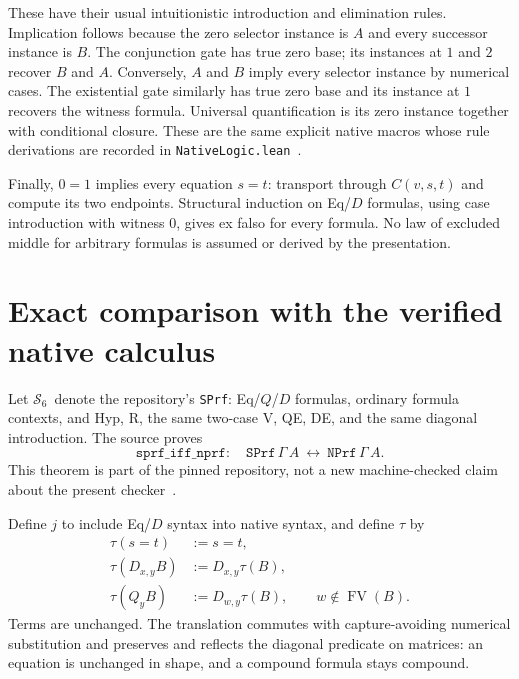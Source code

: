 \documentclass[11pt]{article}
\theoremstyle{definition}\newtheorem{definition}[theorem]{Definition}
\theoremstyle{remark}\newtheorem{remark}[theorem]{Remark}
\newcommand{\Ssix}{\ensuremath{\mathcal S_6}}
\newcommand{\FV}{\operatorname{FV}}
\begin{document}
These have their usual intuitionistic introduction and elimination rules. Implication follows because the zero selector instance is $A$ and every successor instance is $B$. The conjunction gate has true zero base; its instances at $1$ and $2$ recover $B$ and $A$. Conversely, $A$ and $B$ imply every selector instance by numerical cases. The existential gate similarly has true zero base and its instance at $1$ recovers the witness formula. Universal quantification is its zero instance together with conditional closure. These are the same explicit native macros whose rule derivations are recorded in \texttt{NativeLogic.lean}~\cite{logic}.

Finally, $0=1$ implies every equation $s=t$: transport through $C(v,s,t)$ and compute its two endpoints. Structural induction on Eq/$D$ formulas, using case introduction with witness $0$, gives ex falso for every formula. No law of excluded middle for arbitrary formulas is assumed or derived by the presentation.

\section{Exact comparison with the verified native calculus}
\label{sec:equivalence}

Let \Ssix\ denote the repository's \texttt{SPrf}: Eq/$Q$/$D$ formulas, ordinary formula contexts, and Hyp, R, the same two-case V, QE, DE, and the same diagonal introduction. The source proves
\[
 \texttt{sprf\_iff\_nprf}:\quad
 \texttt{SPrf}\,\Gamma\,A\ \longleftrightarrow\ \texttt{NPrf}\,\Gamma\,A.
\]
This theorem is part of the pinned repository, not a new machine-checked claim about the present checker~\cite{six}.

Define $j$ to include Eq/$D$ syntax into native syntax, and define $\tau$ by
\[
\begin{split}
 \tau(s=t)&:=s=t,\\
 \tau(D_{x,y}B)&:=D_{x,y}\tau(B),\\
 \tau(Q_yB)&:=D_{w,y}\tau(B),\qquad w\notin\FV(B).
\end{split}
\]
Terms are unchanged. The translation commutes with capture-avoiding numerical substitution and preserves and reflects the diagonal predicate on matrices: an equation is unchanged in shape, and a compound formula stays compound.
\end{document}
